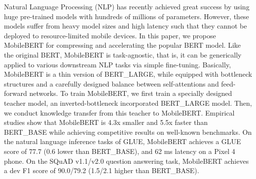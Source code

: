 Natural Language Processing (NLP) has recently achieved great success by using huge pre-trained models with hundreds of millions of parameters. However, these models suffer from heavy model sizes and high latency such that they cannot be deployed to resource-limited mobile devices. In this paper, we propose MobileBERT for compressing and accelerating the popular BERT model. Like the original BERT, MobileBERT is task-agnostic, that is, it can be generically applied to various downstream NLP tasks via simple fine-tuning. Basically, MobileBERT is a thin version of BERT\_LARGE, while equipped with bottleneck structures and a carefully designed balance between self-attentions and feed-forward networks. To train MobileBERT, we first train a specially designed teacher model, an inverted-bottleneck incorporated BERT\_LARGE model. Then, we conduct knowledge transfer from this teacher to MobileBERT. Empirical studies show that MobileBERT is 4.3x smaller and 5.5x faster than BERT\_BASE while achieving competitive results on well-known benchmarks. On the natural language inference tasks of GLUE, MobileBERT achieves a GLUE score of 77.7  (0.6 lower than BERT\_BASE), and 62 ms latency on a Pixel 4 phone. On the SQuAD v1.1/v2.0 question answering task, MobileBERT achieves a dev F1 score of 90.0/79.2  (1.5/2.1 higher than BERT\_BASE).
